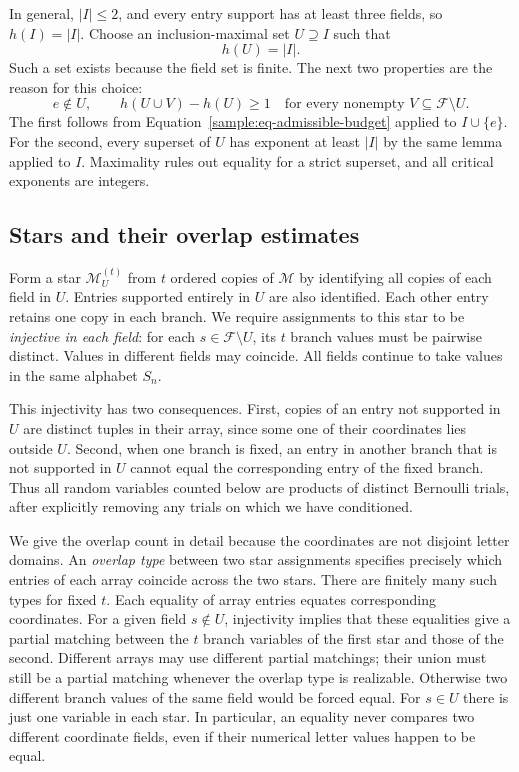 In general, $|I|\leq2$, and every entry support has at least three
fields, so $h(I)=|I|$.  Choose an inclusion-maximal set
$U\supseteq I$ such that
\begin{equation}\label{sample:eq-closure}
h(U)=|I|.
\end{equation}
Such a set exists because the field set is finite.  The next two
properties are the reason for this choice:
\begin{equation}\label{sample:eq-closure-gap}
e\notin U,
\qquad
h(U\cup V)-h(U)\geq1
\quad\text{for every nonempty }V\subseteq\mathcal F\setminus U.
\end{equation}
The first follows from Equation~\eqref{sample:eq-admissible-budget}
applied to $I\cup\{e\}$.  For the second, every superset of $U$
has exponent at least $|I|$ by the same lemma applied to $I$.
Maximality rules out equality for a strict superset, and all critical
exponents are integers.

\subsection{Stars and their overlap estimates}

Form a star $\mathcal M_U^{(t)}$ from $t$ ordered copies of
$\mathcal M$ by identifying all copies of each field in $U$.
Entries supported entirely in $U$ are also identified.  Each other
entry retains one copy in each branch.  We require assignments to this
star to be \emph{injective in each field}: for each
$s\in\mathcal F\setminus U$, its $t$ branch values must be pairwise
distinct.  Values in different fields may coincide.  All fields continue
to take values in the same alphabet $S_n$.

This injectivity has two consequences.  First, copies of an entry not
supported in $U$ are distinct tuples in their array, since some one of
their coordinates lies outside $U$.  Second, when one branch is fixed,
an entry in another branch that is not supported in $U$ cannot equal
the corresponding entry of the fixed branch.  Thus all random variables
counted below are products of distinct Bernoulli trials, after explicitly
removing any trials on which we have conditioned.

We give the overlap count in detail because the coordinates are not
disjoint letter domains.  An \emph{overlap type} between two star
assignments specifies precisely which entries of each array coincide
across the two stars.  There are finitely many such types for fixed $t$.
Each equality of array entries equates corresponding coordinates.  For
a given field $s\notin U$, injectivity implies that these equalities
give a partial matching between the $t$ branch variables of the first
star and those of the second.  Different arrays may use different
partial matchings; their union must still be a partial matching whenever
the overlap type is realizable.  Otherwise two different branch values
of the same field would be forced equal.  For $s\in U$ there is just
one variable in each star.  In particular, an equality never compares
two different coordinate fields, even if their numerical letter values
happen to be equal.

